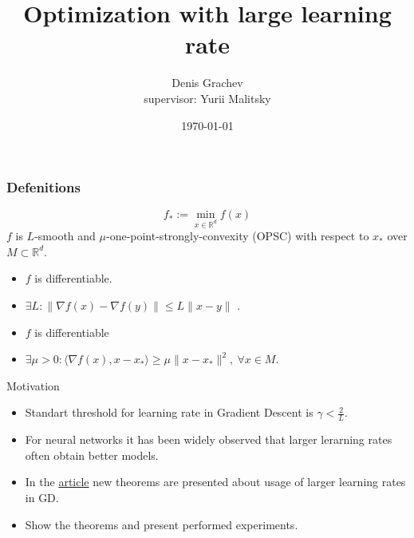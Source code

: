 \documentclass{beamer}
\title{Optimization with large learning rate}
\author[author1]{Denis Grachev\\[10mm]{\small supervisor: Yurii Malitsky}}
\institute{University of Vienna}
\date{\today}
\begin{document}
\frame{\titlepage}
\graphicspath{{./images/}}

\begin{frame}
\frametitle{Defenitions}

$$ f_* := \min_{x \in \mathbb{R}^d} f(x)$$
$f$ is $L$-smooth and 
$\mu$-one-point-strongly-convexity (OPSC) with respect to $x_\ast$ over $M \subset \mathbb{R}^d$.

\begin{definition}
	\begin{itemize}
		\item $f$ is differentiable.
		\item $\exists L: \| \nabla f(x) - \nabla f(y)\| \leq L \| x - y \|$ .
	\end{itemize}
\end{definition}

\begin{definition}
	\begin{itemize}
		\item $f$ is differentiable
		\item $\exists \mu > 0: \langle \nabla f(x), x - x_\ast \rangle \geq \mu \| x - x_\ast\|^2, \: \forall x \in M$.
	\end{itemize}
  
\end{definition}

\end{frame}

\begin{frame}{Motivation}
	\begin{itemize}
		\item Standart threshold for learning rate in Gradient Descent is $\gamma < \frac{2}{L}$.
		\item For neural networks it has been widely observed that larger lerarning rates often obtain better models.
		\item In the  \href{https://arxiv.org/pdf/2205.15142.pdf}{\color{blue}article} new theorems are presented about usage of larger learning rates in GD. 
		\item Show the theorems and present performed experiments.
	\end{itemize}
\end{frame}
\end{document}
